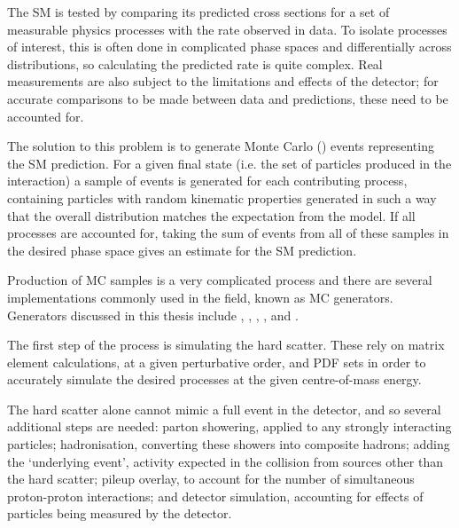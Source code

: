 
The \ac{SM} is tested by comparing its predicted cross sections for a set of
measurable physics processes with the rate observed in data. To isolate
processes of interest, this is often done in complicated phase spaces and
differentially across distributions, so calculating the predicted rate
is quite complex. Real measurements are also subject to the limitations and
effects of the detector; for accurate comparisons to be made between data and
predictions, these need to be accounted for.

The solution to this problem is to generate Monte Carlo () events
representing the \ac{SM} prediction. For a given final state (i.e. the set of
particles produced in the interaction) a sample of events is generated for each
contributing process, containing particles with random kinematic properties
generated in such a way that the overall distribution matches the expectation
from the model. If all processes are accounted for, taking the sum of events
from all of these samples in the desired phase space gives an estimate for the
\ac{SM} prediction.

Production of \ac{MC} samples is a very complicated process and there are
several implementations commonly used in the field, known as
\ac{MC} generators. Generators discussed in this thesis include \madgraph
\cite{madgraph5amc}, \sherpa \cite{sherpa2dot2}, \pythia \cite{pythia8dot2},
\powheg \cite{powheg}, and \herwig \cite{herwigpp}.

The first step of the process is simulating the hard scatter. These rely on
matrix element calculations, at a given perturbative order,
and \ac{PDF} sets in order to accurately simulate the desired
processes at the given centre-of-mass energy.

The hard scatter alone cannot mimic a full event in the detector, and so several
additional steps are needed: parton showering, applied to any strongly
interacting particles; hadronisation, converting these showers into composite
hadrons; adding the `underlying event', activity expected in the collision from
sources other than the hard scatter; pileup overlay, to account for the number
of simultaneous proton-proton interactions; and detector simulation, accounting
for effects of particles being measured by the detector.

